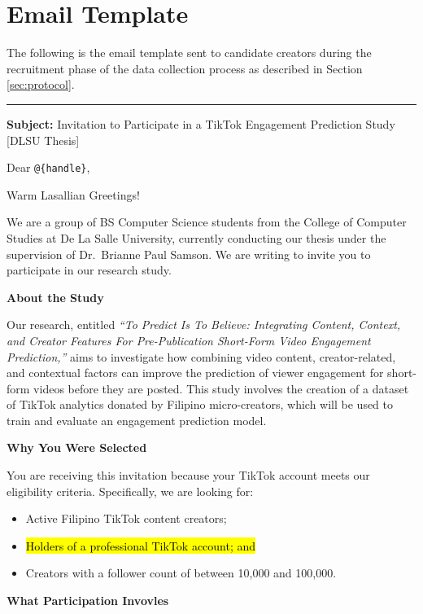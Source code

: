 \chapter{Email Template}
\label{sec:appendixb}

The following is the email template sent to candidate creators during the recruitment phase of the data collection process as described in Section \ref{sec:protocol}.

\noindent\rule{\textwidth}{0.4pt}

\noindent\textbf{Subject:} Invitation to Participate in a TikTok Engagement Prediction Study [DLSU Thesis]

\noindent Dear \texttt{@\{handle\}},

Warm Lasallian Greetings!

We are a group of BS Computer Science students from the College of Computer Studies at De La Salle University, currently conducting our thesis under the supervision of Dr.\ Brianne Paul Samson. We are writing to invite you to participate in our research study.

\noindent\textbf{About the Study}

Our research, entitled \textit{``To Predict Is To Believe: Integrating Content, Context, and Creator Features For Pre-Publication Short-Form Video Engagement Prediction,''} aims to investigate how combining video content, creator-related, and contextual factors can improve the prediction of viewer engagement for short-form videos before they are posted. This study involves the creation of a dataset of TikTok analytics donated by Filipino micro-creators, which will be used to train and evaluate an engagement prediction model.

\noindent\textbf{Why You Were Selected}

You are receiving this invitation because your TikTok account meets our eligibility criteria. Specifically, we are looking for:
\begin{itemize}
    \item Active Filipino TikTok content creators;
     \item \hl{Holders of a professional TikTok account; and}
    \item Creators with a follower count of between 10,000 and 100,000.
\end{itemize}

\noindent\textbf{What Participation Invovles}

